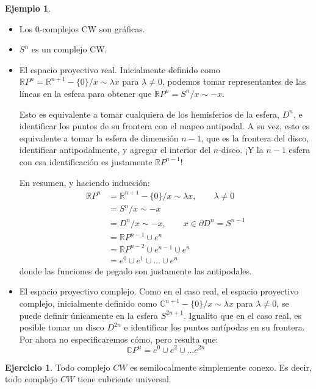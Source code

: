 \documentclass[spanish]{book}
\theoremstyle{definition}
\newtheorem*{ejer}{Ejercicio}
\newtheorem*{ejem}{Ejemplo}
\newcommand{\R}{\mathbb{R}}
\newcommand{\C}{\mathbb{C}}
\begin{document}
	\begin{ejem}\leavevmode
		\begin{itemize}
			\item Los 0-complejos CW son gráficas.
			\item $S^n$ es un complejo CW.
			\item El espacio proyectivo real. Inicialmente definido como $\R P^n=\R^{n+1}-\{0\}/x\sim\lambda x$ para $\lambda\neq0$, podemos tomar representantes de las líneas en la esfera para obtener que $\R P^n=S^n/x\sim -x$. 
			
			Esto es equivalente a tomar cualquiera de los hemisferios de la esfera, $D^{n}$, e identificar los puntos de su frontera con el mapeo antipodal. A su vez, esto es equivalente a tomar la esfera de dimensión $n-1$, que es la frontera del disco, identificar antipodalmente, y agregar el interior del $n$-disco. ¡Y la $n-1$ esfera con esa identificación es justamente $\R P^{n-1}$!
			
			En resumen, y haciendo inducción:
				\begin{align*}
					\R P^n&=\R^{n+1}-\{0\}/x\sim\lambda x,\qquad\lambda\neq0\\
					&=S^n/x\sim-x\\
					&=D^n/x\sim-x,\qquad x\in\partial D^n=S^{n-1}\\
					&=\R P^{n-1}\cup e^n\\
					&=\R P^{n-2}\cup e^{n-1}\cup e^n\\
					&=e^0\cup e^1\cup\ldots\cup e^n
				\end{align*}
				donde las funciones de pegado son justamente las antipodales.
			\item El espacio proyectivo complejo. Como en el caso real, el espacio proyectivo complejo, inicialmente definido como $\C^{n+1}-\{0\}/x\sim\lambda x$ para $\lambda\neq0$, se puede definir únicamente en la esfera $S^{2n+1}$. Igualito que en el caso real, es posible tomar un disco $D^{2n}$ e identificar los puntos antípodas en su frontera. Por ahora no especificaremos cómo, pero resulta que:
			\[\C P^n=e^0\cup e^2\cup\ldots e^{2n}\]
		\end{itemize}
	\end{ejem}
	\begin{ejer}
		Todo complejo $CW$ es semilocalmente simplemente conexo. Es decir, todo complejo $CW$ tiene cubriente universal.
	\end{ejer}
\end{document}
